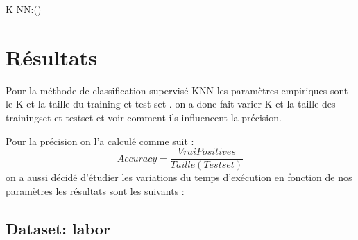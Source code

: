 \documentclass[12pt,a4paper,oneside]{book}
\begin{document}
	\begin{algorithm}[H]
		\DontPrintSemicolon
		
		
		
		\;
		\caption{{\sc K NN:()}}
		\label{algo:duplicate1}
	\end{algorithm}

	
	\section{Résultats}
	Pour la méthode de classification supervisé KNN les paramètres empiriques sont le K et la taille du training et test set .
	on a donc fait varier K et  la taille des trainingset et testset et voir comment ils influencent la précision.
	
	Pour la précision on l'a calculé comme suit : 
	\begin{equation*}
	Accuracy=\frac{VraiPositives}{Taille(Testset)}
	\end{equation*}
	on a aussi décidé d'étudier les variations du temps d'exécution en fonction de nos paramètres  les résultats sont les suivants :
	\subsection{Dataset: labor }
	
\end{document}
